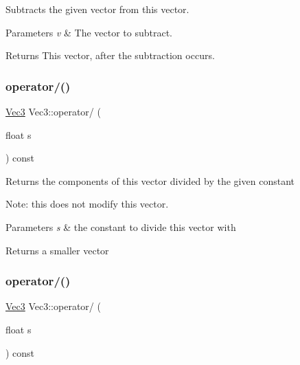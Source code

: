 Subtracts the given vector from this vector.


\begin{DoxyParams}{Parameters}
{\em v} & The vector to subtract. \\
\hline
\end{DoxyParams}
\begin{DoxyReturn}{Returns}
This vector, after the subtraction occurs. 
\end{DoxyReturn}
\mbox{\label{classVec3_a657e29e4b78eb5f4d1795305c26aa310}} 
\subsubsection{\texorpdfstring{operator/()}{operator/()}\hspace{0.1cm}{\footnotesize\ttfamily [1/2]}}
{\footnotesize\ttfamily \hyperlink{classVec3}{Vec3} Vec3\+::operator/ (\begin{DoxyParamCaption}\item[{float}]{s }\end{DoxyParamCaption}) const\hspace{0.3cm}{\ttfamily [inline]}}

Returns the components of this vector divided by the given constant

Note\+: this does not modify this vector.


\begin{DoxyParams}{Parameters}
{\em s} & the constant to divide this vector with \\
\hline
\end{DoxyParams}
\begin{DoxyReturn}{Returns}
a smaller vector 
\end{DoxyReturn}
\mbox{\label{classVec3_a657e29e4b78eb5f4d1795305c26aa310}} 
\subsubsection{\texorpdfstring{operator/()}{operator/()}\hspace{0.1cm}{\footnotesize\ttfamily [2/2]}}
{\footnotesize\ttfamily \hyperlink{classVec3}{Vec3} Vec3\+::operator/ (\begin{DoxyParamCaption}\item[{float}]{s }\end{DoxyParamCaption}) const\hspace{0.3cm}{\ttfamily [inline]}}

